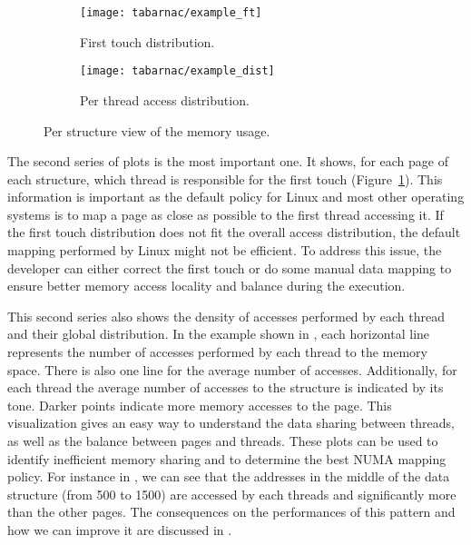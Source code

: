 \begin{figure}[htb]
    \centering
    \begin{subfigure}{.49\linewidth}
        \texttt{[image: tabarnac/example\_ft]}
        \caption{First touch distribution.}
        \label{fig:example_ft}
    \end{subfigure}
    \begin{subfigure}{.49\linewidth}
        \texttt{[image: tabarnac/example\_dist]}
        \caption{Per thread access distribution.}
        \label{fig:example_dist}
    \end{subfigure}
    \caption{Per structure view of the memory usage.}
    \label{fig:example_by_structs}
\end{figure}

The second series of plots is the most important one.
It shows, for each page of each structure, which thread is responsible for the first touch (Figure~\ref{fig:example_ft}).
This information is important as the default policy for \gls{Linux} and most other operating systems is to map a page as close as possible to the first thread accessing it.
If the first touch distribution does not fit the overall access distribution, the default mapping performed by \gls{Linux} might not be efficient.
To address this issue, the developer can either correct the first touch or do some manual data mapping to ensure better memory access locality and balance during the execution.

This second series also shows the density of accesses performed by each thread and their global distribution.
In the example shown in , each horizontal line represents the number of accesses performed by each thread to the memory space.
There is also one line for the average number of accesses.
Additionally, for each thread the average number of accesses to the structure is indicated by its tone.
Darker points indicate more memory accesses to the page. This visualization gives an easy way to understand the data sharing between threads, as well as the balance between pages and
threads.
These plots can be used to identify inefficient memory sharing and to determine the best \gls{NUMA} mapping policy.
For instance in , we can see that the addresses in the middle of the data structure (from 500 to 1500) are accessed by each threads and significantly more than the other pages.
The consequences on the performances of this pattern and how we can improve it are discussed in .

